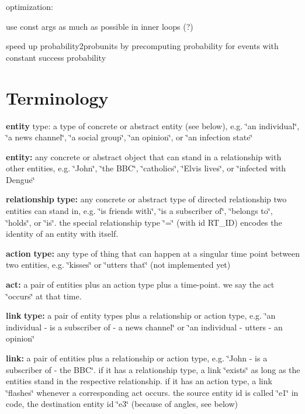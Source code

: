 optimization\+:
\begin{DoxyItemize}
\item use const args as much as possible in inner loops (?)
\item speed up probability2probunits by precomputing probability for events with constant success probability
\end{DoxyItemize}

\section*{Terminology }


\begin{DoxyItemize}
\item {\bfseries entity} type\+: a type of concrete or abstract entity (see below), e.\+g. \char`\"{}an individual\char`\"{}, \char`\"{}a news channel\char`\"{}, \char`\"{}a social group\char`\"{}, \char`\"{}an opinion\char`\"{}, or \char`\"{}an infection state\char`\"{}
\item {\bfseries entity\+:} any concrete or abstract object that can stand in a relationship with other entities, e.\+g. \char`\"{}\+John\char`\"{}, \char`\"{}the B\+B\+C\char`\"{}, \char`\"{}catholics\char`\"{}, \char`\"{}\+Elvis lives\char`\"{}, or \char`\"{}infected with Dengue\char`\"{}
\item {\bfseries relationship} {\bfseries type\+:} any concrete or abstract type of directed relationship two entities can stand in, e.\+g. \char`\"{}is friends with\char`\"{}, \char`\"{}is a subscriber of\char`\"{}, \char`\"{}belongs to\char`\"{}, \char`\"{}holds\char`\"{}, or \char`\"{}is\char`\"{}. the special relationship type \char`\"{}=\char`\"{} (with id R\+T\+\_\+\+ID) encodes the identity of an entity with itself.
\item {\bfseries action} {\bfseries type\+:} any type of thing that can happen at a singular time point between two entities, e.\+g. \char`\"{}kisses\char`\"{} or \char`\"{}utters that\char`\"{} (not implemented yet)
\item {\bfseries act\+:} a pair of entities plus an action type plus a time-\/point. we say the act \char`\"{}occurs\char`\"{} at that time.
\item {\bfseries link} {\bfseries type\+:} a pair of entity types plus a relationship or action type, e.\+g. \char`\"{}an individual -\/ is a subscriber of -\/ a news channel\char`\"{} or \char`\"{}an individual -\/ utters -\/ an opinion\char`\"{}
\item {\bfseries link\+:} a pair of entities plus a relationship or action type, e.\+g. \char`\"{}\+John -\/ is a subscriber of -\/ the B\+B\+C\char`\"{}. if it has a relationship type, a link \char`\"{}exists\char`\"{} as long as the entities stand in the respective relationship. if it has an action type, a link \char`\"{}flashes\char`\"{} whenever a corresponding act occurs. the source entity id is called \char`\"{}e1\char`\"{} in code, the destination entity id \char`\"{}e3\char`\"{} (because of angles, see below)

\end{DoxyItemize}
